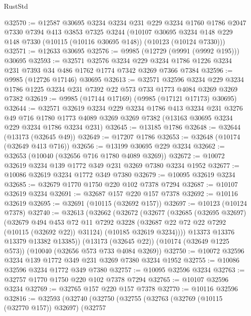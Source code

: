 \begin{lexlean}{RustStd}
\begin{coremodule}
@32570 := @12587
    @30695
    @3234
    @3234
    @231
    @229
    @3234
    @1760
    @1786
    @2047
    @7330
    @7394
    @413
    @3853
    @7325
    @3244
    (@10107 @30695 @3234 @148 @229 @148 @7330 (@10115 (@10116 @30695 @148)) (@10123 (@10124 @7330)))
@32571 := @12633 @30695
@32576 := @9985 (@12729 (@9991 (@9992 @195))) @30695
@32593 := @32571
    @32576
    @3234
    @229
    @3234
    @1786
    @1226
    @3234
    @231
    @7393
    @34
    @486
    @1762
    @1774
    @7342
    @3269
    @7366
    @7384
@32596 := @9985 (@12726 @17146) @30695
@32613 := @32571
    @32596
    @3234
    @229
    @3234
    @1786
    @1225
    @3234
    @231
    @7392
    @22
    @573
    @733
    @1773
    @4084
    @3269
    @3269
    @7382
@32619 := @9985 (@17144 @17169) (@9985 (@17121 @17173) @30695)
@32644 := @32571
    @32619
    @3234
    @229
    @3234
    @1786
    @413
    @3234
    @231
    @3276
    @49
    @716
    @1780
    @1773
    @4089
    @3269
    @3269
    @7382
    (@13163 @30695 @3234 @229 @3234 @1786 @3234 @231)
@32645 := @13185 @1786
@32648 := @32644 (@13173 (@32645 @49))
@32649 := @17207 @1786
@32653 := @32648 (@10174 (@32649 @413 @716))
@32656 := @13199 @30695 @229 @3234
@32662 := @32653 (@10040 (@32656 @716 @1780 @4089 @3269))
@32672 := @10072 @32619 @3234 @139 @1772 @349 @231 @3269 @7380 @3234 @1952
@32677 := @10086 @32619 @3234 @1772 @349 @7380
@32679 := @10095 @32619 @3234
@32685 := @32679 @1770 @1750 @220 @102 @7378 @7294
@32687 := @10107 @32619 @3234
@32691 := @32687 @157 @220 @157 @7378
@32692 := @10116 @32619
@32695 := @32691 (@10115 (@32692 @157))
@32697 := @10123 (@10124 @7378)
@32740 := @32613
    (@32662
      (@32672
        (@32677
          (@32685
            (@32695 @32697)
            (@32679
              @494
              @453
              @72
              @11
              @7292
              @3228
              (@32687 @22 @72 @22 @7292 (@10115 (@32692 @22)) @31124)
              (@10185 @32619 @3234))))
        @13373
        @13376
        @13379
        @13382
        @13385))
    (@13173 (@32645 @22))
    (@10174 (@32649 @1225 @573))
    (@10040 (@32656 @573 @733 @4084 @3269))
@32750 := @10072 @32596 @3234 @139 @1772 @349 @231 @3269 @7380 @3234 @1952
@32755 := @10086 @32596 @3234 @1772 @349 @7380
@32757 := @10095 @32596 @3234
@32763 := @32757 @1770 @1750 @220 @102 @7378 @7294
@32765 := @10107 @32596 @3234
@32769 := @32765 @157 @220 @157 @7378
@32770 := @10116 @32596
@32816 := @32593
    (@32740
      (@32750
        (@32755
          (@32763
            (@32769 (@10115 (@32770 @157)) @32697)
            (@32757

\end{coremodule}
\end{lexlean}
